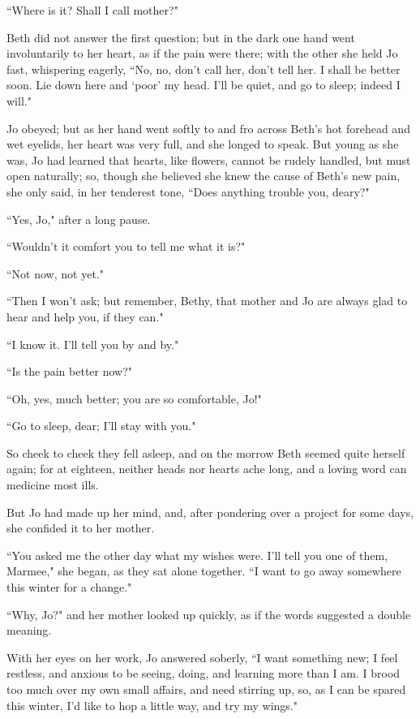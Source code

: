``Where is it? Shall I call mother?"

Beth did not answer the first question; but in the dark one hand went
involuntarily to her heart, as if the pain were there; with the other
she held Jo fast, whispering eagerly, ``No, no, don't
call her, don't tell her. I shall be better soon. Lie
down here and `poor' my head.
I'll be quiet, and go to sleep; indeed I will."

Jo obeyed; but as her hand went softly to and fro across
Beth's hot forehead and wet eyelids, her heart was very
full, and she longed to speak. But young as she was, Jo had learned that
hearts, like flowers, cannot be rudely handled, but must open naturally;
so, though she believed she knew the cause of Beth's new
pain, she only said, in her tenderest tone, ``Does anything trouble you,
deary?"

``Yes, Jo," after a long pause.

``Wouldn't it comfort you to tell me what it is?"

``Not now, not yet."

``Then I won't ask; but remember, Bethy, that mother and
Jo are always glad to hear and help you, if they can."

``I know it. I'll tell you by and by."

``Is the pain better now?"

``Oh, yes, much better; you are so comfortable, Jo!"

``Go to sleep, dear; I'll stay with you."

So cheek to cheek they fell asleep, and on the morrow Beth seemed quite
herself again; for at eighteen, neither heads nor hearts ache long, and
a loving word can medicine most ills.

But Jo had made up her mind, and, after pondering over a project for
some days, she confided it to her mother.

``You asked me the other day what my wishes were. I'll
tell you one of them, Marmee," she began, as they sat alone together. ``I
want to go away somewhere this winter for a change."

``Why, Jo?" and her mother looked up quickly, as if the words suggested a
double meaning.

With her eyes on her work, Jo answered soberly, ``I want something new; I
feel restless, and anxious to be seeing, doing, and learning more than I
am. I brood too much over my own small affairs, and need stirring up,
so, as I can be spared this winter, I'd like to hop a
little way, and try my wings."

